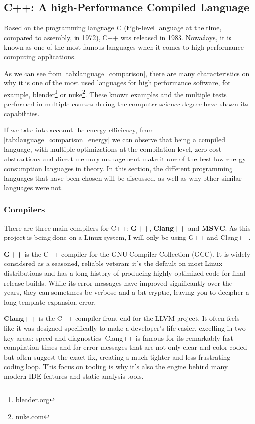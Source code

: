 \subsection{C++: A high-Performance Compiled Language}
Based on the programming language C (high-level language at the time, compared to assembly, in 1972), C++ was released in 1983. Nowadays, it is known as one of the most famous languages when it comes to high performance computing applications.

As we can see from \autoref{tab:language_comparison}, there are many characteristics on why it is one of the most used languages for high performance software, for example, blender\footnote{\href{https://blender.org}{blender.org}} or nuke\footnote{\href{https://www.foundry.com/products/nuke-family}{nuke.com}}. These known examples and the multiple tests performed in multiple courses during the computer science degree have shown its capabilities.


If we take into account the energy efficiency, from \autoref{tab:language_comparison_energy} we can observe that being a compiled language, with multiple optimizations at the compilation level, zero-cost abstractions and direct memory management make it one of the best low energy consumption languages in theory.
In this section, the different programming languages that have been chosen will be discussed, as well as why other similar languages were not.



\subsubsection{Compilers}

There are three main compilers for C++: \textbf{G++}, \textbf{Clang++} and \textbf{MSVC}. As this project is being done on a Linux system, I will only be using G++ and Clang++.

\textbf{G++} is the C++ compiler for the GNU Compiler Collection (GCC). It is widely considered as a seasoned, reliable veteran; it's the default on most Linux distributions and has a long history of producing highly optimized code for final release builds. While its error messages have improved significantly over the years, they can sometimes be verbose and a bit cryptic, leaving you to decipher a long template expansion error.

\textbf{Clang++} is the C++ compiler front-end for the \gls{LLVM} project. It often feels like it was designed specifically to make a developer's life easier, excelling in two key areas: speed and diagnostics. Clang++ is famous for its remarkably fast compilation times and for error messages that are not only clear and color-coded but often suggest the exact fix, creating a much tighter and less frustrating coding loop. This focus on tooling is why it's also the engine behind many modern IDE features and static analysis tools.


